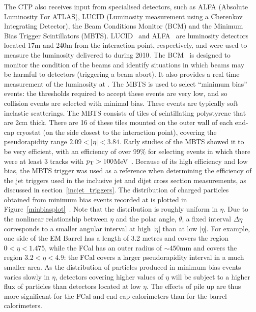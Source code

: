 The CTP also receives input from specialised detectors, such as ALFA (Absolute Luminosity For ATLAS), LUCID (Luminosity measurement using a Cherenkov Integrating Detector), the Beam Conditions Monitor (BCM) and the Minimum Bias Trigger Scintillators (MBTS). LUCID~\cite{LUCID} and ALFA~\cite{ALFA} are luminosity detectors located 17m and 240m from the \atlas interaction point, respectively, and were used to measure the luminosity delivered to \atlas during 2010. The BCM~\cite{BCM} is designed to monitor the condition of the beams and identify situations in which beams may be harmful to \atlas detectors (triggering a beam abort). It also provides a real time measurement of the luminosity at \atlas. The MBTS is used to select ``minimum bias'' events: the thresholds required to accept these events are very low, and so collision events are selected with minimal bias. These events are typically soft inelastic scatterings. The MBTS consists of tiles of scintillating polystyrene that are 2cm thick. There are 16 of these tiles mounted on the outer wall of each end-cap cryostat (on the side closest to the interaction point), covering the pseudorapidity range $2.09 < |\eta| < 3.84$. Early studies of the MBTS showed it to be very efficient, with an efficiency of over 99\% for selecting events in which there were at least 3 tracks with $p_{\mathrm{T}} > 100$MeV~\cite{Tompkins_minbias}. Because of its high efficiency and low bias, the MBTS trigger was used as a reference when determining the efficiency of the jet triggers used in the inclusive jet and dijet cross section measurements, as discussed in section~\ref{incjet_triggers}. The distribution of charged particles obtained from minimum bias events recorded at \atlas is plotted in Figure~\ref{minbiasplot}~\cite{atlas_minbias}. Note that the distribution is roughly uniform in $\eta$. Due to the nonlinear relationship between $\eta$ and the polar angle, $\theta$, a fixed interval $\Delta \eta$ corresponds to a smaller angular interval at high $|\eta|$ than at low $|\eta|$. For example, one side of the EM Barrel has a length of 3.2 metres and covers the region $0<\eta<1.475$, while the FCal has an outer radius of $\sim450$mm and covers the region $3.2<\eta<4.9$: the FCal covers a larger pseudorapidity interval in a much smaller area. As the distribution of particles produced in minimum bias events varies slowly in $\eta$, detectors covering higher values of $\eta$ will be subject to a higher flux of particles than detectors located at low $\eta$. The effects of pile up are thus more significant for the FCal and end-cap calorimeters than for the barrel calorimeters.

